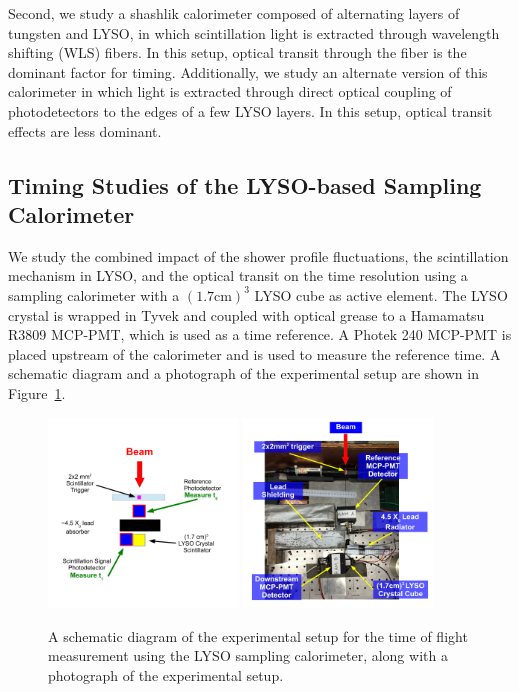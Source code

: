 \documentclass[12pt]{article}
\begin{document}
Second, we study a shashlik calorimeter composed of alternating layers of
tungsten and LYSO, in which scintillation light is extracted through wavelength
shifting (WLS) fibers. In this setup, optical transit through the fiber is the
dominant factor for timing. Additionally, we study an alternate version of this
calorimeter in which light is extracted through direct optical coupling of
photodetectors to the edges of a few LYSO layers. In this setup, optical transit
effects are less dominant.



\subsection{Timing Studies of the LYSO-based Sampling Calorimeter}

We study the combined impact of the shower profile fluctuations, the
scintillation mechanism in LYSO, and the optical transit on the time resolution
using a sampling calorimeter with a $(1.7\mathrm{cm})^{3}$ LYSO cube as active
element. The LYSO crystal is wrapped in Tyvek and coupled with optical grease to
a Hamamatsu R3809 MCP-PMT, which is used as a time reference. A Photek 240
MCP-PMT is placed upstream of the calorimeter and is used to measure the
reference time. A schematic diagram and a photograph of the experimental setup
are shown in Figure~\ref{fig:LYSOSamplingCaloSetup}. 

\begin{figure}[h] \centering
\includegraphics[width=0.45\textwidth]{figs/LYSOSamplingCaloSetupSchematic} 
\includegraphics[width=0.45\textwidth]{figs/LYSOSamplingCaloSetupPhoto} 
\caption{ A schematic diagram of the experimental setup for the
time of flight measurement using the LYSO sampling calorimeter, 
along with a photograph of the experimental setup. } 
\label{fig:LYSOSamplingCaloSetup}
\end{figure}
\end{document}
